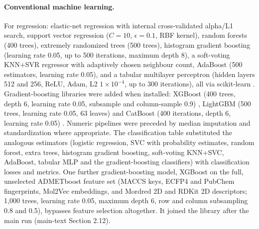 \documentclass[11pt,a4paper]{article}
\begin{document}
\paragraph{Conventional machine learning.} For regression: elastic-net regression with internal cross-validated alpha/L1 search, support vector regression ($C=10$, $\epsilon=0.1$, RBF kernel), random forests (400 trees), extremely randomized trees (500 trees), histogram gradient boosting (learning rate 0.05, up to 500 iterations, maximum depth 8), a soft-voting KNN+SVR regressor with adaptively chosen neighbour count, AdaBoost (500 estimators, learning rate 0.05), and a tabular multilayer perceptron (hidden layers 512 and 256, ReLU, Adam, L2 $1\times10^{-4}$, up to 300 iterations), all via scikit-learn \cite{pedregosa2011scikit}. Gradient-boosting libraries were added when installed: XGBoost (400 trees, depth 6, learning rate 0.05, subsample and column-sample 0.9) \cite{chen2016xgboost}, LightGBM (500 trees, learning rate 0.05, 63 leaves) \cite{ke2017lightgbm} and CatBoost (400 iterations, depth 6, learning rate 0.05) \cite{prokhorenkova2018catboost}. Numeric pipelines were preceded by median imputation and standardization where appropriate. The classification table substituted the analogous estimators (logistic regression, SVC with probability estimates, random forest, extra trees, histogram gradient boosting, soft-voting KNN+SVC, AdaBoost, tabular MLP and the gradient-boosting classifiers) with classification losses and metrics. One further gradient-boosting model, XGBoost on the full, unselected ADMETboost feature set (MACCS keys, ECFP4 and PubChem fingerprints, Mol2Vec embeddings, and Mordred 2D and RDKit 2D descriptors; 1,000 trees, learning rate 0.05, maximum depth 6, row and column subsampling 0.8 and 0.5), bypasses feature selection altogether. It joined the library after the main run (main-text Section 2.12).
\end{document}
